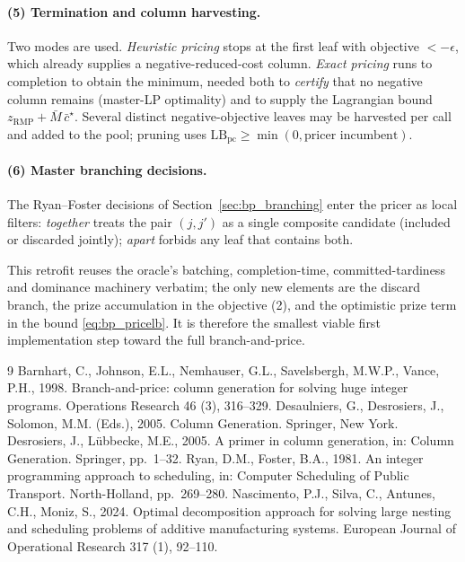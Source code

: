 \documentclass[review,3p,times,authoryear]{elsarticle}
\newcommand{\Mbar}{\bar{M}}
\begin{document}
\paragraph{(5) Termination and column harvesting.} Two modes are used.
\emph{Heuristic pricing} stops at the first leaf with objective $<-\epsilon$, which
already supplies a negative-reduced-cost column. \emph{Exact pricing} runs to
completion to obtain the minimum, needed both to \emph{certify} that no negative
column remains (master-LP optimality) and to supply the Lagrangian bound
$z_{\mathrm{RMP}}+\Mbar\,\bar c^\star$. Several distinct negative-objective leaves
may be harvested per call and added to the pool; pruning uses
$\mathrm{LB}_{\mathrm{pc}}\ge\min(0,\text{pricer incumbent})$.

\paragraph{(6) Master branching decisions.} The Ryan--Foster decisions of
Section~\ref{sec:bp_branching} enter the pricer as local filters: \emph{together}
treats the pair $(j,j')$ as a single composite candidate (included or discarded
jointly); \emph{apart} forbids any leaf that contains both.

This retrofit reuses the oracle's batching, completion-time, committed-tardiness
and dominance machinery verbatim; the only new elements are the discard branch, the
prize accumulation in the objective \textnormal{(2)}, and the optimistic prize term
in the bound \eqref{eq:bp_pricelb}. It is therefore the smallest viable first
implementation step toward the full branch-and-price.


\begin{thebibliography}{9}
Barnhart, C., Johnson, E.L., Nemhauser, G.L., Savelsbergh, M.W.P., Vance, P.H.,
1998. Branch-and-price: column generation for solving huge integer programs.
Operations Research 46 (3), 316--329.
Desaulniers, G., Desrosiers, J., Solomon, M.M. (Eds.), 2005. Column Generation.
Springer, New York.
Desrosiers, J., L\"ubbecke, M.E., 2005. A primer in column generation, in:
Column Generation. Springer, pp.\ 1--32.
Ryan, D.M., Foster, B.A., 1981. An integer programming approach to scheduling,
in: Computer Scheduling of Public Transport. North-Holland, pp.\ 269--280.
Nascimento, P.J., Silva, C., Antunes, C.H., Moniz, S., 2024. Optimal
decomposition approach for solving large nesting and scheduling problems of
additive manufacturing systems. European Journal of Operational Research 317 (1),
92--110.
\end{thebibliography}
\end{document}
